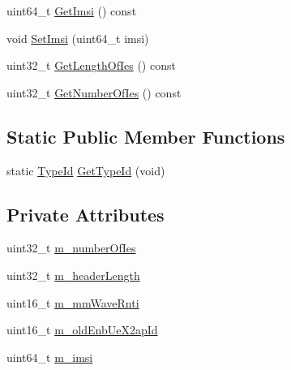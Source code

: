 \begin{DoxyCompactItemize}
\item 
uint64\+\_\+t \hyperlink{classns3_1_1EpcX2SecondaryCellHandoverCompletedHeader_a5d31911220efbacb37bb1df86f650408}{Get\+Imsi} () const 
\item 
void \hyperlink{classns3_1_1EpcX2SecondaryCellHandoverCompletedHeader_ae1b6ae60e1049d3aab154ebbb87dd013}{Set\+Imsi} (uint64\+\_\+t imsi)
\item 
uint32\+\_\+t \hyperlink{classns3_1_1EpcX2SecondaryCellHandoverCompletedHeader_a9c26e742b758ebc4b99557566e92e802}{Get\+Length\+Of\+Ies} () const 
\item 
uint32\+\_\+t \hyperlink{classns3_1_1EpcX2SecondaryCellHandoverCompletedHeader_a3d8cd5dc636bf2c744486022418a483f}{Get\+Number\+Of\+Ies} () const 
\end{DoxyCompactItemize}
\subsection*{Static Public Member Functions}
\begin{DoxyCompactItemize}
\item 
static \hyperlink{classns3_1_1TypeId}{Type\+Id} \hyperlink{classns3_1_1EpcX2SecondaryCellHandoverCompletedHeader_a496af0ce9337effc82fd04c62834baa6}{Get\+Type\+Id} (void)
\end{DoxyCompactItemize}
\subsection*{Private Attributes}
\begin{DoxyCompactItemize}
\item 
uint32\+\_\+t \hyperlink{classns3_1_1EpcX2SecondaryCellHandoverCompletedHeader_a576bd1c4d8cfc5970ebb7b63a7151acb}{m\+\_\+number\+Of\+Ies}
\item 
uint32\+\_\+t \hyperlink{classns3_1_1EpcX2SecondaryCellHandoverCompletedHeader_ac0304a4be495a284b2a8e72bccdd609d}{m\+\_\+header\+Length}
\item 
uint16\+\_\+t \hyperlink{classns3_1_1EpcX2SecondaryCellHandoverCompletedHeader_a5ca4f74de5b15e9642bd8924c7598dcc}{m\+\_\+mm\+Wave\+Rnti}
\item 
uint16\+\_\+t \hyperlink{classns3_1_1EpcX2SecondaryCellHandoverCompletedHeader_a85935fad7c77a923df925fee55f9cf68}{m\+\_\+old\+Enb\+Ue\+X2ap\+Id}
\item 
uint64\+\_\+t \hyperlink{classns3_1_1EpcX2SecondaryCellHandoverCompletedHeader_aec850a598d10768a2be00a05a2df358a}{m\+\_\+imsi}
\end{DoxyCompactItemize}
